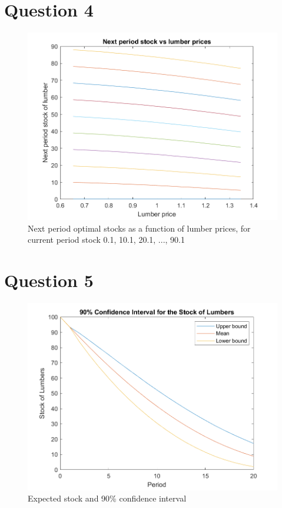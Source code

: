 \documentclass[12pt]{article}
\begin{document}
\section*{Question 4}

\begin{figure}[h]
\includegraphics[width=\textwidth]{nextstock.png}
\caption{Next period optimal stocks as a function of lumber prices, for current period stock 0.1, 10.1, 20.1, ..., 90.1}
\end{figure}

\clearpage
\section*{Question 5}
\begin{figure}[h]
\includegraphics[width=\textwidth]{ci.png}
\caption{Expected stock and 90\% confidence interval}
\end{figure}
\clearpage
\end{document}
